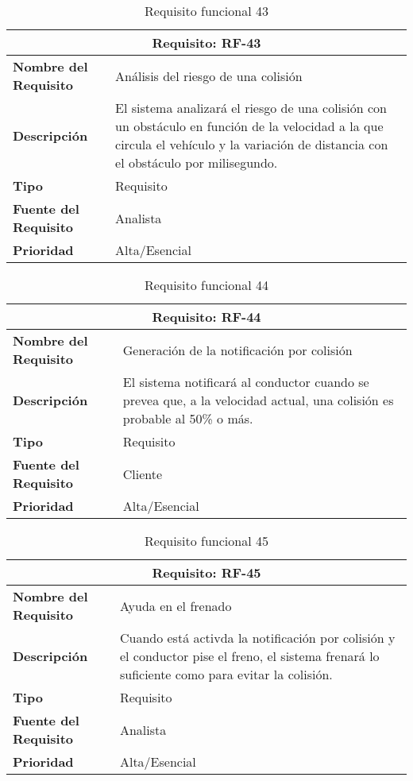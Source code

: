 \begin{table}[H]
\begin{center}
\begin{tabular}{p{} p{7cm}}
\multicolumn{2}{c}{\textbf{Requisito: RF-43} } \\
\hline \hline
\textbf{Nombre del Requisito} & Análisis del riesgo de una colisión\\
\hline
\textbf{Descripción} &  El sistema analizará el riesgo de una colisión con un obstáculo en función de la velocidad a la que circula el vehículo y la variación de distancia con el obstáculo por milisegundo.\\
\hline
\textbf{Tipo} & Requisito  \\
\hline
\textbf{Fuente del Requisito} & Analista  \\
\hline
\textbf{Prioridad} & Alta/Esencial \\ \hline
\end{tabular}
\caption{Requisito funcional 43}
\label{tab:RF-43}
\end{center}
\end{table}

\begin{table}[H]
\begin{center}
\begin{tabular}{p{} p{7cm}}
\multicolumn{2}{c}{\textbf{Requisito: RF-44} } \\
\hline \hline
\textbf{Nombre del Requisito} & Generación de la notificación por colisión\\
\hline
\textbf{Descripción} &  El sistema notificará al conductor cuando se prevea que, a la velocidad actual, una colisión es probable al 50\% o más.\\
\hline
\textbf{Tipo} & Requisito  \\
\hline
\textbf{Fuente del Requisito} & Cliente  \\
\hline
\textbf{Prioridad} & Alta/Esencial \\ \hline
\end{tabular}
\caption{Requisito funcional 44}
\label{tab:RF-44}
\end{center}
\end{table}

\begin{table}[H]
\begin{center}
\begin{tabular}{p{} p{7cm}}
\multicolumn{2}{c}{\textbf{Requisito: RF-45} } \\
\hline \hline
\textbf{Nombre del Requisito} & Ayuda en el frenado\\
\hline
\textbf{Descripción} & Cuando está activda la notificación por colisión y el conductor pise el freno, el sistema frenará lo suficiente como para evitar la colisión. \\
\hline
\textbf{Tipo} & Requisito  \\
\hline
\textbf{Fuente del Requisito} & Analista  \\
\hline
\textbf{Prioridad} & Alta/Esencial \\ \hline
\end{tabular}
\caption{Requisito funcional 45}
\label{tab:RF-45}
\end{center}
\end{table}

